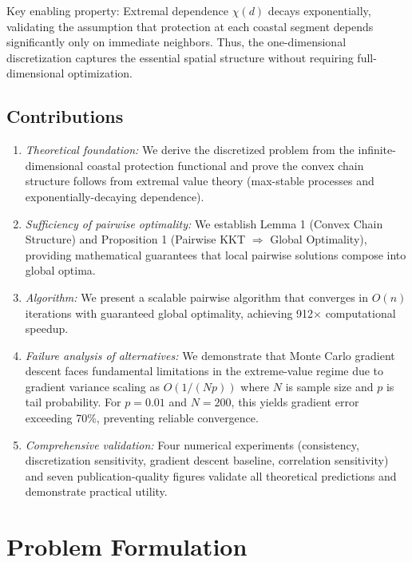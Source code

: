 \documentclass[12pt]{article}
\theoremstyle{definition}
\begin{document}
Key enabling property: Extremal dependence $\chi(d)$ decays exponentially, validating the assumption that protection at each coastal segment depends significantly only on immediate neighbors. Thus, the one-dimensional discretization captures the essential spatial structure without requiring full-dimensional optimization.

\subsection{Contributions}

\begin{enumerate}
    \item \emph{Theoretical foundation:} We derive the discretized problem from the infinite-dimensional coastal protection functional and prove the convex chain structure follows from extremal value theory (max-stable processes and exponentially-decaying dependence).

    \item \emph{Sufficiency of pairwise optimality:} We establish Lemma 1 (Convex Chain Structure) and Proposition 1 (Pairwise KKT $\Rightarrow$ Global Optimality), providing mathematical guarantees that local pairwise solutions compose into global optima.

    \item \emph{Algorithm:} We present a scalable pairwise algorithm that converges in $O(n)$ iterations with guaranteed global optimality, achieving 912× computational speedup.

    \item \emph{Failure analysis of alternatives:} We demonstrate that Monte Carlo gradient descent faces fundamental limitations in the extreme-value regime due to gradient variance scaling as $O(1/(Np))$ where $N$ is sample size and $p$ is tail probability. For $p=0.01$ and $N=200$, this yields gradient error exceeding 70\%, preventing reliable convergence.

    \item \emph{Comprehensive validation:} Four numerical experiments (consistency, discretization sensitivity, gradient descent baseline, correlation sensitivity) and seven publication-quality figures validate all theoretical predictions and demonstrate practical utility.
\end{enumerate}

\section{Problem Formulation}
\end{document}
